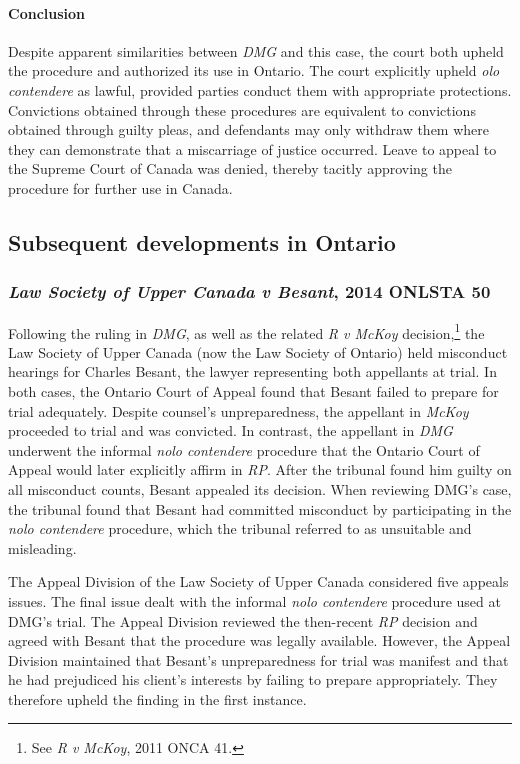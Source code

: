 \paragraph{Conclusion\\}

Despite apparent similarities between \textit{DMG} and this case, the court both upheld the procedure and authorized its use in Ontario. The court explicitly upheld \textit{olo contendere} as lawful, provided parties conduct them with appropriate protections. Convictions obtained through these procedures are equivalent to convictions obtained through guilty pleas, and defendants may only withdraw them where they can demonstrate that a miscarriage of justice occurred. Leave to appeal to the Supreme Court of Canada was denied, thereby tacitly approving the procedure for further use in Canada.

\subsection{Subsequent developments in Ontario}

\subsubsection{\textit{Law Society of Upper Canada v Besant}, 2014 ONLSTA 50}

Following the ruling in \textit{DMG}, as well as the related \textit{R v McKoy} decision,\footnote{See \textit{R v McKoy}, 2011 ONCA 41.} the Law Society of Upper Canada (now the Law Society of Ontario) held misconduct hearings for Charles Besant, the lawyer representing both appellants at trial. In both cases, the Ontario Court of Appeal found that Besant failed to prepare for trial adequately. Despite counsel's unpreparedness, the appellant in \textit{McKoy} proceeded to trial and was convicted. In contrast, the appellant in \textit{DMG} underwent the informal \textit{nolo contendere} procedure that the Ontario Court of Appeal would later explicitly affirm in \textit{RP}. After the tribunal found him guilty on all misconduct counts, Besant appealed its decision. When reviewing DMG's case, the tribunal found that Besant had committed misconduct by participating in the \textit{nolo contendere} procedure, which the tribunal referred to as unsuitable and misleading.

The Appeal Division of the Law Society of Upper Canada considered five appeals issues. The final issue dealt with the informal \textit{nolo contendere} procedure used at DMG's trial. The Appeal Division reviewed the then-recent \textit{RP} decision and agreed with Besant that the procedure was legally available. However, the Appeal Division maintained that Besant's unpreparedness for trial was manifest and that he had prejudiced his client's interests by failing to prepare appropriately. They therefore upheld the finding in the first instance.

